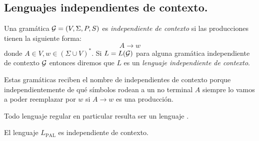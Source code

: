 \documentclass[tesis.tex]{subfiles}
\begin{document}
\subsection{Lenguajes independientes de contexto.} \label{subs_ic}
\begin{deff}
	Una gramática ${\cal G} = (V, \Sigma, P, S) $ es \emph{independiente de contexto} si las producciones tienen la siguiente forma:
	\begin{equation*}
		A \to w
	\end{equation*}
	donde $A \in V, w \in (\Sigma \cup V)^*$.  
	Si $L=L({\cal G})$ para alguna gramática independiente de contexto $\cal G$ entonces diremos que $L$ es un \emph{lenguaje independiente de contexto}.
\end{deff}
Estas gramáticas reciben el nombre de independientes de contexto porque independientemente de qué símbolos rodean a un no terminal $A$ siempre lo vamos a poder reemplazar por $w$ si $A \to w$ es una producción.

\begin{obs}
	Todo lenguaje regular en particular resulta ser un lenguaje \ic.
\end{obs}


\begin{prop}\label{leng_ej_gram_palindromos}
	El lenguaje $ L_{\text{PAL}}$ es independiente de contexto. 
\end{prop}
\end{document}
